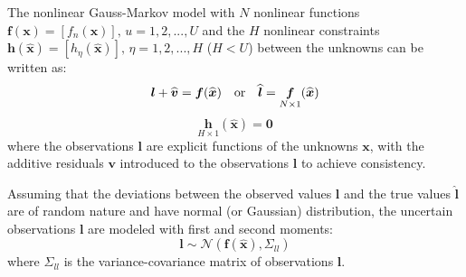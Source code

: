 The nonlinear Gauss-Markov model with $N$ nonlinear functions $\boldsymbol f(\boldsymbol x)=[f_n(\boldsymbol x)],\,u=1,2,...,U$ and the $H$ nonlinear constraints $\boldsymbol h(\hat{\boldsymbol x})=[h_\eta(\hat{\boldsymbol x})],\,\eta=1,2,...,H$ %
($H<U$) between the unknowns can be written as:
\begin{equation} \label{eq:GM-ObsEq}
\boldsymbol l+\widehat{\boldsymbol v}=\boldsymbol f(\widehat{\boldsymbol x})\quad \textnormal{or}\quad \widehat{\boldsymbol l}=\underset{N\times 1}{\boldsymbol f}(\widehat{\boldsymbol x})
\end{equation}
\begin{equation} \label{eq:GM-ConEq}
\underset{H\times 1}{\boldsymbol h}(\widehat{\boldsymbol x})=\mathbf{0}
\end{equation}
where the observations $\boldsymbol l$ are explicit functions of the unknowns $\boldsymbol x$, with the additive residuals $\boldsymbol v$ introduced to the observations $\boldsymbol l$ to achieve consistency.

Assuming that the deviations between the observed values $\boldsymbol l$ and the true values $\widehat{\boldsymbol l}$ are of random nature and have normal (or Gaussian) distribution, the uncertain observations $\boldsymbol l$ are modeled with first and second moments:
\begin{equation}
\boldsymbol l\sim\mathcal{N}(\boldsymbol f(\widehat{\boldsymbol x}) ,\mathsf{\Sigma}_{ll})
\end{equation}
where $\mathsf{\Sigma}_{ll}$ is the variance-covariance matrix of observations $\boldsymbol l$.

